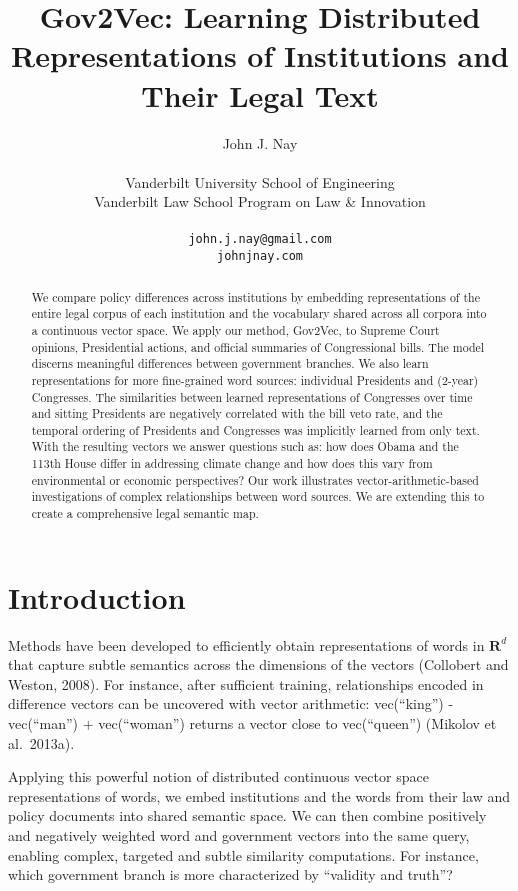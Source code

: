\documentclass[11pt,letterpaper]{article}
\title{Gov2Vec: Learning Distributed Representations of Institutions and Their Legal Text\Thanks{ Forthcoming paper in 2016 \emph{Proceedings of Empirical Methods in Natural Language Processing} Workshop on NLP and Computational Social Science.}}
\author{John J. Nay\\ \\
 Vanderbilt University School of Engineering \\
  Vanderbilt Law School Program on Law \& Innovation\\
  \\
  {\tt john.j.nay@gmail.com}
  \\
  {\tt johnjnay.com}}
\date{}
\begin{document}
\maketitle

\begin{abstract}
We compare policy differences across institutions by embedding representations of the entire legal corpus of each institution and the vocabulary shared across all corpora into a continuous vector space. We apply our method, Gov2Vec, to Supreme Court opinions, Presidential actions, and official summaries of Congressional bills. The model discerns meaningful differences between government branches. We also learn representations for more fine-grained word sources: individual Presidents and (2-year) Congresses. The similarities between learned representations of Congresses over time and sitting Presidents are negatively correlated with the bill veto rate, and the temporal ordering of Presidents and Congresses was implicitly learned from only text. With the resulting vectors we answer questions such as: how does Obama and the 113th House differ in addressing climate change and how does this vary from environmental or economic perspectives? Our work illustrates vector-arithmetic-based investigations of complex relationships between word sources. We are extending this to create a comprehensive legal semantic map.
\end{abstract}

\section{Introduction}\label{introduction}

Methods have been developed to efficiently obtain representations of words in \(\mathbf{R}^d\) that
capture subtle semantics across the dimensions of the vectors (Collobert and Weston, 2008). For instance, after sufficient training, relationships encoded in difference vectors can be uncovered with vector arithmetic: vec(``king'') - vec(``man'') + vec(``woman'') returns a vector close to vec(``queen'') (Mikolov et al.~2013a).

Applying this powerful notion of distributed continuous vector space representations of words, we
embed institutions and the words from their law and policy documents
into shared semantic space. We can then combine positively and
negatively weighted word and government vectors into the same query,
enabling complex, targeted and subtle similarity computations. For instance, which government branch is more characterized by ``validity and truth''? 
\end{document}
